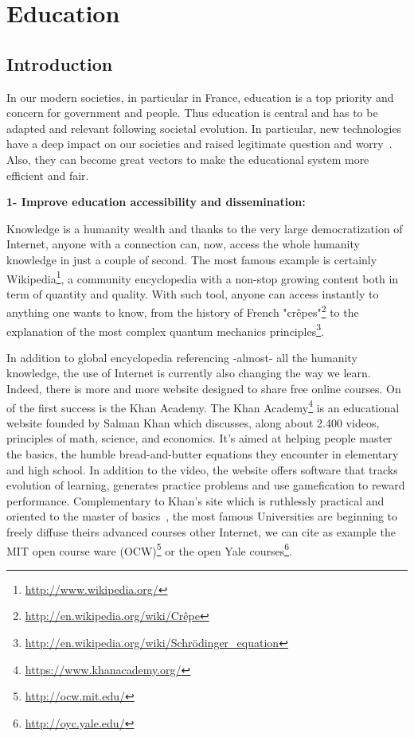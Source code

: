 \chapter{Education} %


\section{Introduction} %

In our modern societies, in particular in France, education is a top priority and concern for government and people. Thus education is central and has to be adapted and relevant following societal evolution. In particular, new technologies have a deep impact on our societies and raised legitimate question and worry~\cite{plester2008txt}. Also, they can become great vectors to make the educational system more efficient and fair.


\textbf{1- Improve education accessibility and dissemination:}

Knowledge is a humanity wealth and thanks to the very large democratization of Internet, anyone with a connection can, now, access the whole humanity knowledge in just a couple of second. The most famous example is certainly Wikipedia\footnote{\url{http://www.wikipedia.org/}}, a community encyclopedia with a non-stop growing content both in term of quantity and quality. With such tool, anyone can access instantly to anything one wants to know, from the history of French "crêpes"\footnote{\url{http://en.wikipedia.org/wiki/Crêpe}} to the explanation of the most complex quantum mechanics principles\footnote{\url{http://en.wikipedia.org/wiki/Schrödinger_equation}}.

In addition to global encyclopedia  referencing -almost- all the humanity knowledge, the use of Internet is currently also changing the way we learn. Indeed, there is more and more website designed to share free online courses. On of the first success is the Khan Academy.
The Khan Academy\footnote{\url{https://www.khanacademy.org/}} is an educational website founded by Salman Khan which discusses, along about 2.400 videos, principles of math, science, and economics.  It's aimed at helping people master the basics, the humble bread-and-butter equations they encounter in elementary and high school. In addition to the video, the website offers software that tracks evolution of learning, generates practice problems and use gamefication to reward performance.
Complementary to Khan's site which is ruthlessly practical and oriented to the master of basics~\cite{thompson2011khan}, the most famous Universities are beginning to freely diffuse theirs advanced courses other Internet, we can cite as example the MIT open course ware (OCW)\footnote{\url{http://ocw.mit.edu/}} or the open Yale courses\footnote{\url{http://oyc.yale.edu/}}.

